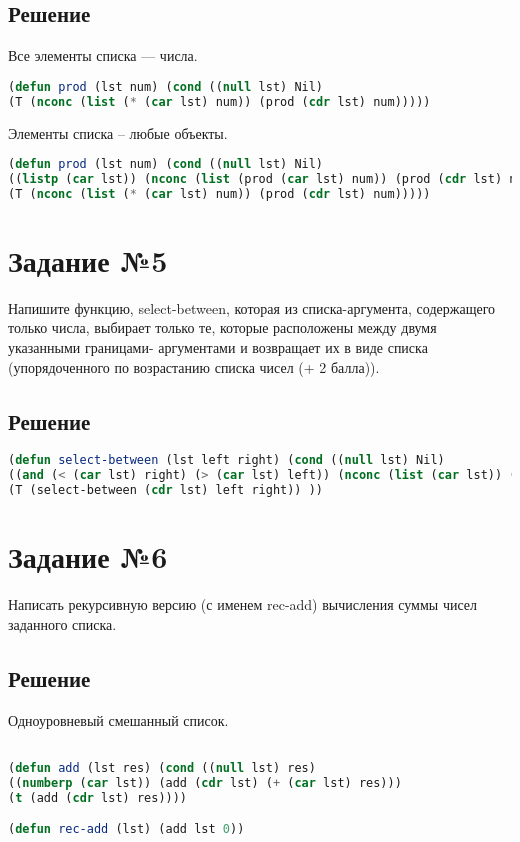 \subsection*{Решение}
Все элементы списка --- числа.
\begin{lstlisting}[label=third,caption=Решение задания №3, language=lisp]
(defun prod (lst num) (cond ((null lst) Nil)
(T (nconc (list (* (car lst) num)) (prod (cdr lst) num)))))
\end{lstlisting}

Элементы списка -- любые объекты.
\begin{lstlisting}[label=third,caption=Решение задания №3, language=lisp]
(defun prod (lst num) (cond ((null lst) Nil)
((listp (car lst)) (nconc (list (prod (car lst) num)) (prod (cdr lst) num)))
(T (nconc (list (* (car lst) num)) (prod (cdr lst) num)))))
\end{lstlisting}

\section*{Задание №5}
Напишите функцию, select-between, которая из списка-аргумента, содержащего только
числа, выбирает только те, которые расположены между двумя указанными границами-
аргументами и возвращает их в виде списка (упорядоченного по возрастанию списка чисел
(+ 2 балла)).

\subsection*{Решение}
\begin{lstlisting}[label=5,caption=Решение задания №5, language=lisp]
(defun select-between (lst left right) (cond ((null lst) Nil)
((and (< (car lst) right) (> (car lst) left)) (nconc (list (car lst)) (select-between (cdr lst) left right)))
(T (select-between (cdr lst) left right)) ))

\end{lstlisting}


\section*{Задание №6}
Написать рекурсивную версию (с именем rec-add) вычисления суммы чисел заданного
списка.
\subsection*{Решение}

Одноуровневый смешанный список.
\begin{lstlisting}[label=5,caption=Решение задания №5, language=lisp]

(defun add (lst res) (cond ((null lst) res) 
((numberp (car lst)) (add (cdr lst) (+ (car lst) res)))
(t (add (cdr lst) res))))

(defun rec-add (lst) (add lst 0))

\end{lstlisting}

